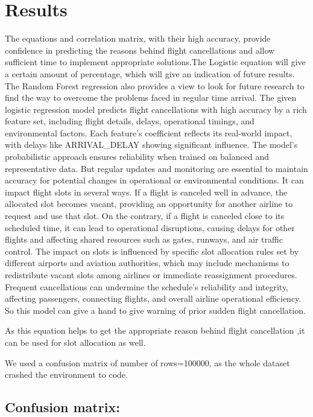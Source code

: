\documentclass[conference]{IEEEtran}
\begin{document}
\section{Results}
\noindent The equations and correlation matrix, with their high accuracy, provide confidence in predicting the reasons behind flight cancellations and allow sufficient time to implement appropriate solutions.The Logistic equation will give a certain amount of percentage, which will give an indication of future results.    
\noindent   The Random Forest regression also provides a view to look for future research to find the way to overcome the problems faced in regular time arrival. The given logistic regression model predicts flight cancellations with high accuracy by a rich feature set, including flight details, delays, operational timings, and environmental factors. Each feature's coefficient reflects its real-world impact, with delays like ARRIVAL\_DELAY showing significant influence. The model's probabilistic approach ensures reliability when trained on balanced and representative data. But regular updates and monitoring are essential to maintain accuracy for potential changes in operational or environmental conditions. It can impact flight slots in several ways. If a flight is canceled well in advance, the allocated slot becomes vacant, providing an opportunity for another airline to request and use that slot. On the contrary, if a flight is canceled close to its scheduled time, it can lead to operational disruptions, causing delays for other flights and affecting shared resources such as gates, runways, and air traffic control. The impact on slots is influenced by specific slot allocation rules set by different airports and aviation authorities, which may include mechanisms to redistribute vacant slots among airlines or immediate reassignment procedures. Frequent cancellations can undermine the schedule's reliability and integrity, affecting passengers, connecting flights, and overall airline operational efficiency. So this model can give a hand to give warning of prior sudden flight cancellation.

\noindent As this equation helps to get the appropriate reason behind flight cancellation ,it can be used for slot allocation as well.

\noindent We used a confusion matrix of number of rows=100000, as the whole dataset crashed the environment to code.
\subsection{Confusion matrix:}\label{subsec5}
\begin{center}
\noindent [9738    0]

\noindent  [   0  262]

\end{center}
\end{document}
